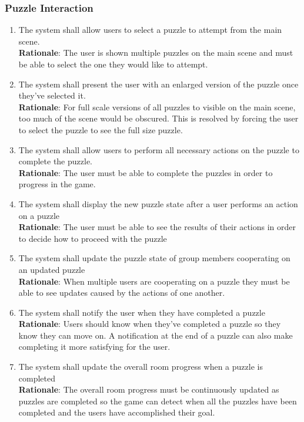 \documentclass[12pt]{article}
\begin{document}
\subsubsection{Puzzle Interaction}
    \begin{enumerate}[label=PI\arabic*., series=PuzzleInteract]
        \item The system shall allow users to select a puzzle to attempt from the main scene.\\
        \textbf{Rationale}: The user is shown multiple puzzles on the main scene and must be able to select the one they would like to attempt.
        \item The system shall present the user with an enlarged version of the puzzle once they've selected it.\\
        \textbf{Rationale}: For full scale versions of all puzzles to visible on the main scene, too much of the scene would be obscured. This is resolved by forcing the user to select the puzzle to see the full size puzzle.
        \item The system shall allow users to perform all necessary actions on the puzzle to complete the puzzle.\\
        \textbf{Rationale}: The user must be able to complete the puzzles in order to progress in the game.
        \item The system shall display the new puzzle state after a user performs an action on a puzzle\\
        \textbf{Rationale}: The user must be able to see the results of their actions in order to decide how to proceed with the puzzle
        \item The system shall update the puzzle state of group members cooperating on an updated puzzle\\
        \textbf{Rationale}: When multiple users are cooperating on a puzzle they must be able to see updates caused by the actions of one another.
        \item The system shall notify the user when they have completed a puzzle\\
        \textbf{Rationale}: Users should know when they've completed a puzzle so they know they can move on. A notification at the end of a puzzle can also make completing it more satisfying for the user.
        \item The system shall update the overall room progress when a puzzle is completed\\
        \textbf{Rationale}: The overall room progress must be continuously updated as puzzles are completed so the game can detect when all the puzzles have been completed and the users have accomplished their goal.
    \end{enumerate}
\end{document}
